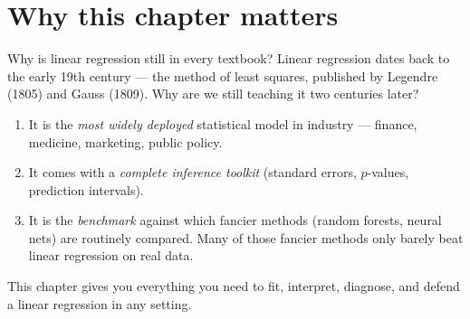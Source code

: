\documentclass[aspectratio=169,11pt]{beamer}
\begin{document}
\section{Why this chapter matters}

\begin{frame}{Why is linear regression still in every textbook?}
  Linear regression dates back to the early 19th century --- the method
  of least squares, published by Legendre (1805) and Gauss (1809). Why
  are we still teaching it two centuries later?
  \begin{takeaway}
    \begin{enumerate}
      \item It is the \emph{most widely deployed} statistical model in
            industry --- finance, medicine, marketing, public policy.
      \item It comes with a \emph{complete inference toolkit} (standard
            errors, $p$-values, prediction intervals).
      \item It is the \emph{benchmark} against which fancier methods
            (random forests, neural nets) are routinely compared. Many
            of those fancier methods only barely beat linear
            regression on real data.
    \end{enumerate}
  \end{takeaway}
  This chapter gives you everything you need to fit, interpret,
  diagnose, and defend a linear regression in any setting.
\end{frame}
\end{document}
